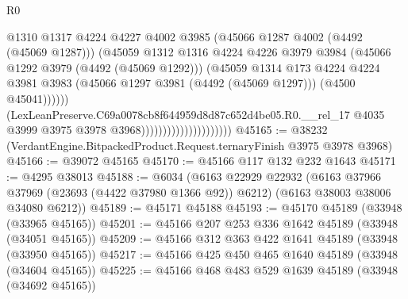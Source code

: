 \begin{lexlean}{R0}
\begin{coremodule}
                                                  @1310
                                                  @1317
                                                  @4224
                                                  @4227
                                                  @4002
                                                  @3985
                                                  (@45066 @1287 @4002 (@4492 (@45069 @1287)))
                                                  (@45059
                                                    @1312
                                                    @1316
                                                    @4224
                                                    @4226
                                                    @3979
                                                    @3984
                                                    (@45066 @1292 @3979 (@4492 (@45069 @1292)))
                                                    (@45059
                                                      @1314
                                                      @173
                                                      @4224
                                                      @4224
                                                      @3981
                                                      @3983
                                                      (@45066 @1297 @3981 (@4492 (@45069 @1297)))
                                                      (@4500 @45041))))))
                                            (LexLeanPreserve.C69a0078cb8f644959d8d87c652d4be05.R0.__rel_17
                                              @4035
                                              @3999
                                              @3975
                                              @3978
                                              @3968)))))))))))))))))))))
@45165 := @38232 (VerdantEngine.BitpackedProduct.Request.ternaryFinish @3975 @3978 @3968)
@45166 := @39072 @45165
@45170 := @45166 @117 @132 @232 @1643
@45171 := @4295 @38013
@45188 := @6034
    (@6163
      @22929
      @22932
      (@6163 @37966 @37969 (@23693 (@4422 @37980 @1366 @92)) @6212)
      (@6163 @38003 @38006 @34080 @6212))
@45189 := @45171 @45188
@45193 := @45170 @45189 (@33948 (@33965 @45165))
@45201 := @45166 @207 @253 @336 @1642 @45189 (@33948 (@34051 @45165))
@45209 := @45166 @312 @363 @422 @1641 @45189 (@33948 (@33950 @45165))
@45217 := @45166 @425 @450 @465 @1640 @45189 (@33948 (@34604 @45165))
@45225 := @45166 @468 @483 @529 @1639 @45189 (@33948 (@34692 @45165))

\end{coremodule}
\end{lexlean}
